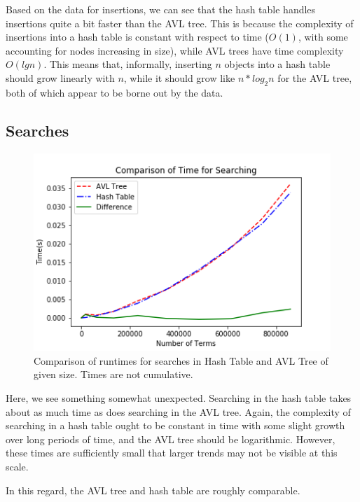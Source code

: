 \documentclass{article}
\begin{document}
Based on the data for insertions, we can see that the hash table handles insertions quite a bit faster than the AVL tree. This is because the complexity of insertions into a hash table is constant with respect to time ($O(1)$, with some accounting for nodes increasing in size), while AVL trees have time complexity $O(lgn)$. This means that, informally, inserting $n$ objects into a hash table should grow linearly with $n$, while it should grow like $n*log_2n$ for the AVL tree, both of which appear to be borne out by the data.

\subsection{Searches}

\begin{figure}[H]
  \centering
  \includegraphics[width=\linewidth]{comparison-search.png}
  \caption{Comparison of runtimes for searches in Hash Table and AVL Tree of given size. Times are not cumulative.}
\end{figure}

Here, we see something somewhat unexpected. Searching in the hash table takes about as much time as does searching in the AVL tree. Again, the complexity of searching in a hash table ought to be constant in time with some slight growth over long periods of time, and the AVL tree should be logarithmic. However, these times are sufficiently small that larger trends may not be visible at this scale.

In this regard, the AVL tree and hash table are roughly comparable.
\end{document}
